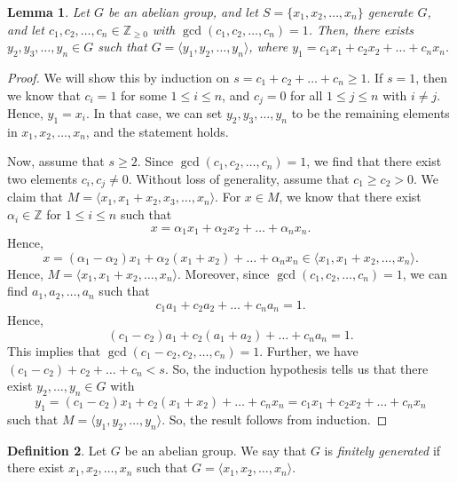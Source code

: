 \documentclass[a4paper, openany]{memoir}
\theoremstyle{definition}
\newtheorem{definition}{Definition}[section]
\theoremstyle{plain}
\newtheorem{lemma}[definition]{Lemma}
\begin{document}
    \begin{lemma}
        Let $G$ be an abelian group, and let $S = \{x_1, x_2, \dots, x_n\}$ generate $G$, and let $c_1, c_2, \dots, c_n \in \mathbb{Z}_{\geq 0}$ with $\gcd(c_1, c_2, \dots, c_n) = 1$. Then, there exists $y_2, y_3, \dots, y_n \in G$ such that $G = \langle y_1, y_2, \dots, y_n \rangle$, where $y_1 = c_1x_1 + c_2x_2 + \dots + c_nx_n$.
    \end{lemma}
    \begin{proof}
        We will show this by induction on $s = c_1 + c_2 + \dots + c_n \geq 1$. If $s = 1$, then we know that $c_i = 1$ for some $1 \leq i \leq n$, and $c_j = 0$ for all $1 \leq j \leq n$ with $i \neq j$. Hence, $y_1 = x_i$. In that case, we can set $y_2, y_3, \dots, y_n$ to be the remaining elements in $x_1, x_2, \dots, x_n$, and the statement holds. 
        
        Now, assume that $s \geq 2$. Since $\gcd(c_1, c_2, \dots, c_n) = 1$, we find that there exist two elements $c_i, c_j \neq 0$. Without loss of generality, assume that $c_1 \geq c_2 > 0$. We claim that $M = \langle x_1, x_1 + x_2, x_3, \dots, x_n \rangle$. For $x \in M$, we know that there exist $\alpha_i \in \mathbb{Z}$ for $1 \leq i \leq n$ such that
        \[x = \alpha_1 x_1 + \alpha_2 x_2 + \dots + \alpha_n x_n.\]
        Hence,
        \[x = (\alpha_1 - \alpha_2) x_1 + \alpha_2 (x_1 + x_2) + \dots + \alpha_n x_n \in \langle x_1, x_1 + x_2, \dots, x_n \rangle.\]
        Hence, $M = \langle x_1, x_1 + x_2, \dots, x_n \rangle$. Moreover, since $\gcd(c_1, c_2, \dots, c_n) = 1$, we can find $a_1, a_2, \dots, a_n$ such that
        \[c_1 a_1 + c_2 a_2 + \dots + c_n a_n = 1.\]
        Hence,
        \[(c_1 - c_2) a_1 + c_2 (a_1 + a_2) + \dots + c_n a_n = 1.\]
        This implies that $\gcd(c_1 - c_2, c_2, \dots, c_n) = 1$. Further, we have $(c_1 - c_2) + c_2 + \dots + c_n < s$. So, the induction hypothesis tells us that there exist $y_2, \dots, y_n \in G$ with
        \[y_1 = (c_1 - c_2) x_1 + c_2 (x_1 + x_2) + \dots + c_n x_n = c_1 x_1 + c_2 x_2 + \dots + c_n x_n\]
        such that $M = \langle y_1, y_2, \dots, y_n \rangle$. So, the result follows from induction.
    \end{proof}

    \begin{definition}
        Let $G$ be an abelian group. We say that $G$ is \emph{finitely generated} if there exist $x_1, x_2, \dots, x_n$ such that $G = \langle x_1, x_2, \dots, x_n \rangle$.
    \end{definition}
\end{document}
